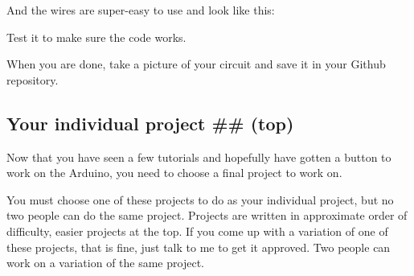 \documentclass[letterpaper,10pt,english]{/usr/local/lib/python2.7/dist-packages/sphinx/texinputs/sphinxhowto}
\begin{document}
And the wires are super-easy to use and look like this:

Test it to make sure the code works.

When you are done, take a picture of your circuit and save it in your
Github repository.\subsection{Your individual project \#\# (top)}

Now that you have seen a few tutorials and hopefully have gotten a
button to work on the Arduino, you need to choose a final project to
work on.

You must choose one of these projects to do as your individual project,
but no two people can do the same project. Projects are written in
approximate order of difficulty, easier projects at the top. If you come
up with a variation of one of these projects, that is fine, just talk to
me to get it approved. Two people can work on a variation of the same
project.
\end{document}

